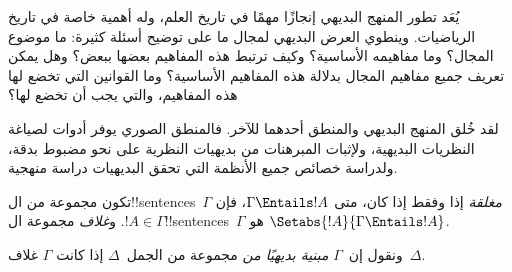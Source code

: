 \documentclass[../../../include/open-logic-section]{subfiles}
\begin{document}

\begin{explain}
يُعَد تطور المنهج البديهي إنجازًا مهمًا في تاريخ العلم، وله أهمية
خاصة في تاريخ الرياضيات. وينطوي العرض البديهي لمجال ما على توضيح
أسئلة كثيرة: ما موضوع المجال؟ وما مفاهيمه الأساسية؟ وكيف ترتبط هذه
المفاهيم بعضها ببعض؟ وهل يمكن تعريف جميع مفاهيم المجال بدلالة هذه
المفاهيم الأساسية؟ وما القوانين التي تخضع لها هذه المفاهيم، والتي
يجب أن تخضع لها؟

لقد خُلق المنهج البديهي والمنطق أحدهما للآخر. فالمنطق الصوري يوفر
أدوات لصياغة النظريات البديهية، ولإثبات المبرهنات من بديهيات النظرية
على نحو مضبوط بدقة، ولدراسة خصائص جميع الأنظمة التي تحقق البديهيات
دراسة منهجية.
\end{explain}

\begin{defn}
تكون مجموعة من ال!!{sentence}s~$\Gamma$ \emph{مغلقة} إذا وفقط إذا
كان، متى $\Gamma \Entails !A$، فإن $!A \in \Gamma$. و\emph{غلاف}
مجموعة ال!!{sentence}s~$\Gamma$ هو
$\Setabs{!A}{\Gamma \Entails !A}$.

ونقول إن~$\Gamma$ \emph{مبنية بديهيًا من} مجموعة من الجمل~$\Delta$
إذا كانت $\Gamma$ غلاف~$\Delta$.
\end{defn}
\end{document}
